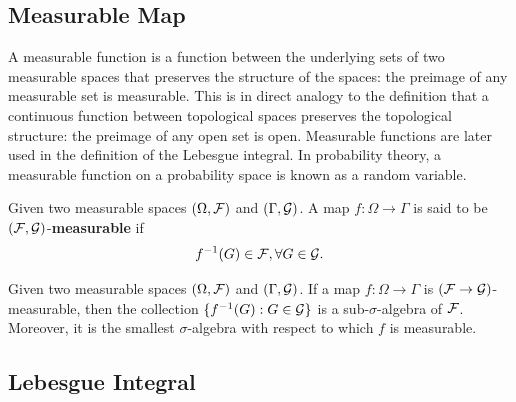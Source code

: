 


\subsection{Measurable Map}

A measurable function is a function between the underlying sets of two measurable spaces that preserves the structure of the spaces: the preimage of any measurable set is measurable. This is in direct analogy to the definition that a continuous function between topological spaces preserves the topological structure: the preimage of any open set is open. Measurable functions are later used in the definition of the Lebesgue integral. In probability theory, a measurable function on a probability space is known as a random variable.

\begin{definition}
 Given two measurable spaces $(\Omega, \mathcal{F})$ and $(\Gamma,\mathcal{G})$. A map $f:\Omega\to\Gamma$ is said to be $(\mathcal{F},\mathcal{G})$-\textbf{measurable}  if
 $$f^{-1}(G)\in\mathcal{F},\forall G\in \mathcal{G}.$$
\end{definition}

\begin{proposition}
 \label{preposition:preimage-of-a-measurable-map-over-the imaged-sigma-algebra-is-a-sigma-algebra}
 Given two measurable spaces $(\Omega, \mathcal{F})$ and $(\Gamma,\mathcal{G})$. If a map $f:\Omega\to\Gamma$ is $(\mathcal{F}\to\mathcal{G})$-measurable, then the collection $\{f^{-1}(G) : G\in\mathcal{G}\}$ is a sub-$\sigma$-algebra of $\mathcal{F}$. Moreover, it is the smallest $\sigma$-algebra with respect to which $f$ is measurable.
\end{proposition}

\subsection{Lebesgue Integral}

